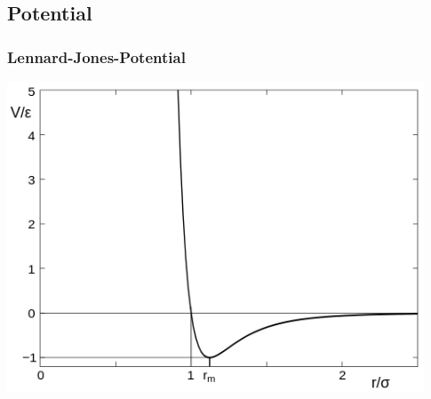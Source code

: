 \documentclass[11pt]{beamer}
\begin{document}
\subsection{Potential}

\begin{frame}
  \frametitle{Lennard-Jones-Potential}
   \vspace{-0.2cm}
    \hspace*{+0.25cm}
    \includegraphics[width=0.93\textwidth]{img/LennardJonesPotential.png}
\end{frame}
\end{document}
